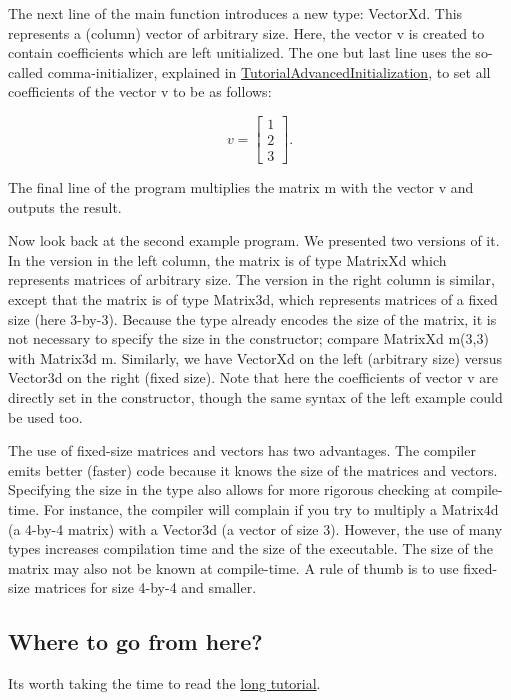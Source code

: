 The next line of the {\ttfamily main} function introduces a new type\+: {\ttfamily Vector\+Xd}. This represents a (column) vector of arbitrary size. Here, the vector {\ttfamily v} is created to contain {} coefficients which are left unitialized. The one but last line uses the so-\/called comma-\/initializer, explained in \hyperlink{group___tutorial_advanced_initialization}{Tutorial\+Advanced\+Initialization}, to set all coefficients of the vector {\ttfamily v} to be as follows\+:

\[ v = \begin{bmatrix} 1 \\ 2 \\ 3 \end{bmatrix}. \]

The final line of the program multiplies the matrix {\ttfamily m} with the vector {\ttfamily v} and outputs the result.

Now look back at the second example program. We presented two versions of it. In the version in the left column, the matrix is of type {\ttfamily Matrix\+Xd} which represents matrices of arbitrary size. The version in the right column is similar, except that the matrix is of type {\ttfamily Matrix3d}, which represents matrices of a fixed size (here 3-\/by-\/3). Because the type already encodes the size of the matrix, it is not necessary to specify the size in the constructor; compare {\ttfamily Matrix\+Xd m(3,3)} with {\ttfamily Matrix3d m}. Similarly, we have {\ttfamily Vector\+Xd} on the left (arbitrary size) versus {\ttfamily Vector3d} on the right (fixed size). Note that here the coefficients of vector {\ttfamily v} are directly set in the constructor, though the same syntax of the left example could be used too.

The use of fixed-\/size matrices and vectors has two advantages. The compiler emits better (faster) code because it knows the size of the matrices and vectors. Specifying the size in the type also allows for more rigorous checking at compile-\/time. For instance, the compiler will complain if you try to multiply a {\ttfamily Matrix4d} (a 4-\/by-\/4 matrix) with a {\ttfamily Vector3d} (a vector of size 3). However, the use of many types increases compilation time and the size of the executable. The size of the matrix may also not be known at compile-\/time. A rule of thumb is to use fixed-\/size matrices for size 4-\/by-\/4 and smaller.\hypertarget{_getting_started_GettingStartedConclusion}{}\subsection{Where to go from here?}\label{_getting_started_GettingStartedConclusion}
It\textquotesingle{}s worth taking the time to read the \hyperlink{group___tutorial_matrix_class}{long tutorial}.

